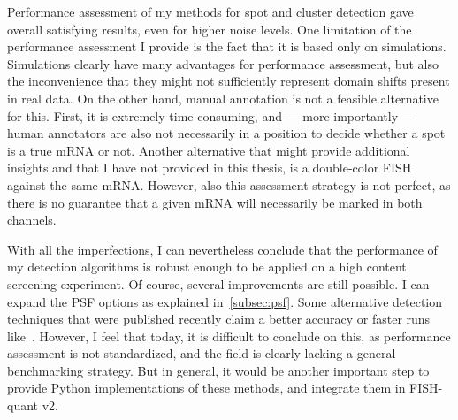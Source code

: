 Performance assessment of my methods for spot and cluster detection gave overall satisfying results, even for higher noise levels.
One limitation of the performance assessment I provide is the fact that it is based only on simulations.
Simulations clearly have many advantages for performance assessment, but also the inconvenience that they might not sufficiently represent domain shifts present in real data.
On the other hand, manual annotation is not a feasible alternative for this.
First, it is extremely time-consuming, and --- more importantly --- human annotators are also not necessarily in a position to decide whether a spot is a true \ac{mRNA} or not.
Another alternative that might provide additional insights and that I have not provided in this thesis, is a double-color \ac{FISH} against the same \ac{mRNA}.
However, also this assessment strategy is not perfect, as there is no guarantee that a given \ac{mRNA} will necessarily be marked in both channels.

With all the imperfections, I can nevertheless conclude that the performance of my detection algorithms is robust enough to be applied on a high content screening experiment.
Of course, several improvements are still possible.
I can expand the \ac{PSF} options as explained in~\ref{subsec:psf}.
Some alternative detection techniques that were published recently claim a better accuracy or faster runs like~\cite{bahry_rs-fish_2021, bouilhol_deepspot_2022}.
However, I feel that today, it is difficult to conclude on this, as performance assessment is not standardized, and the field is clearly lacking a general benchmarking strategy.
But in general, it would be another important step to provide Python implementations of these methods, and integrate them in FISH-quant v2.

